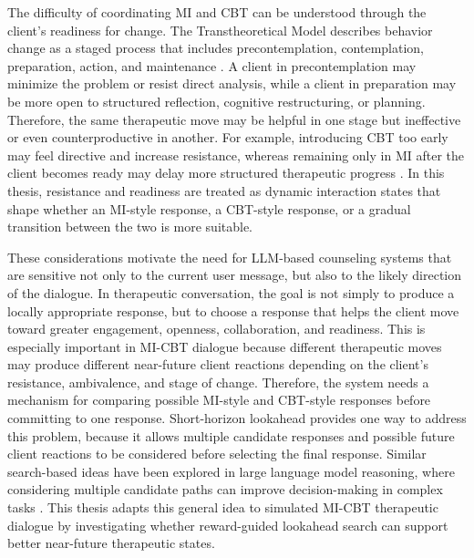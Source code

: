 The difficulty of coordinating MI and CBT can be understood through the client's readiness for change. The Transtheoretical Model describes behavior change as a staged process that includes precontemplation, contemplation, preparation, action, and maintenance \cite{prochaska1997transtheoretical,raihan2023stages}. A client in precontemplation may minimize the problem or resist direct analysis, while a client in preparation may be more open to structured reflection, cognitive restructuring, or planning. Therefore, the same therapeutic move may be helpful in one stage but ineffective or even counterproductive in another. For example, introducing CBT too early may feel directive and increase resistance, whereas remaining only in MI after the client becomes ready may delay more structured therapeutic progress \cite{arkowitz2004integrating,westra2009adding,westra2016integrating,randall2017motivational,marker2018efficacy}. In this thesis, resistance and readiness are treated as dynamic interaction states that shape whether an MI-style response, a CBT-style response, or a gradual transition between the two is more suitable.

These considerations motivate the need for LLM-based counseling systems that are sensitive not only to the current user message, but also to the likely direction of the dialogue. In therapeutic conversation, the goal is not simply to produce a locally appropriate response, but to choose a response that helps the client move toward greater engagement, openness, collaboration, and readiness. This is especially important in MI-CBT dialogue because different therapeutic moves may produce different near-future client reactions depending on the client's resistance, ambivalence, and stage of change. Therefore, the system needs a mechanism for comparing possible MI-style and CBT-style responses before committing to one response. Short-horizon lookahead provides one way to address this problem, because it allows multiple candidate responses and possible future client reactions to be considered before selecting the final response. Similar search-based ideas have been explored in large language model reasoning, where considering multiple candidate paths can improve decision-making in complex tasks \cite{yao2023tree}. This thesis adapts this general idea to simulated MI-CBT therapeutic dialogue by investigating whether reward-guided lookahead search can support better near-future therapeutic states.

